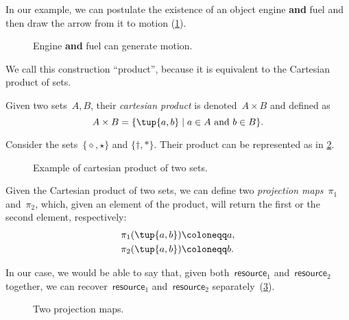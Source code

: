 In our example, we can postulate the existence of an object \textsf{engine} \textbf{ and }\textsf{fuel} and then draw the arrow from it to motion (\cref{fig:e13}).

\begin{figure}[h!]
    \centering
    \caption{Engine \textbf{and} fuel can generate motion. \label{fig:e13}}
\end{figure}

We call this construction ``product'', because it is equivalent to the Cartesian product of sets.

\begin{definition}
\label{def:cartesian-product}
   Given two sets~$A,B$, their \emph{cartesian product} is denoted~$A\times  B$
   and defined as 
   \begin{equation}
       A\times  B=\{ \tup{a,b}\mid a\in A\text{ and } b\in B\}.
   \end{equation}
\end{definition}

\begin{example}
Consider the sets~$\{\diamond,\star\}$ and $\{\dagger, \ast\}$. Their product can be represented as in \cref{fig:cartesian-product}.
\begin{figure}[h!]
    \centering
    \caption{Example of cartesian product of two sets.\label{fig:cartesian-product}}
\end{figure}
\end{example}

Given the Cartesian product of two sets, we can define two \emph{projection maps}~$\pi_1$ and~$\pi_2$, which, given an element of the product, will return the first or the second element, respectively:
\begin{equation}
\begin{aligned}
    \pi_1(\tup{a,b}) &\coloneqq a,\\
    \pi_2(\tup{a,b}) &\coloneqq b.
\end{aligned}
\end{equation}

In our case, we would be able to say that, given both~$\textsf{resource}_1$ and~$\textsf{resource}_2$ together, we can recover~$\textsf{resource}_1$ and~$\textsf{resource}_2$ separately~(\cref{fig:resource-product}).

\begin{figure}[h!]
    \centering
    \caption{Two projection maps. \label{fig:resource-product}}
\end{figure}


